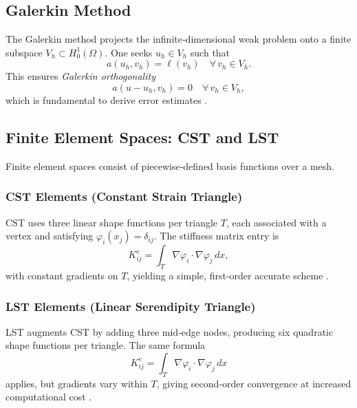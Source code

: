 \subsection{Galerkin Method}

The Galerkin method projects the infinite‐dimensional weak problem onto a finite subspace $V_h\subset H_0^1(\Omega)$.  One seeks $u_h\in V_h$ such that
\begin{equation}
  a(u_h,v_h)=\ell(v_h)
  \quad\forall\,v_h\in V_h.
\end{equation}
This ensures \emph{Galerkin orthogonality}
\begin{equation}
  a(u-u_h,v_h)=0
  \quad\forall\,v_h\in V_h,
\end{equation}
which is fundamental to derive error estimates \cite{Galerkin_method}.

\subsection{Finite Element Spaces: CST and LST}

Finite element spaces consist of piecewise‐defined basis functions over a mesh.

\subsubsection{CST Elements (Constant Strain Triangle)}

CST uses three linear shape functions per triangle $T$, each associated with a vertex and satisfying $\varphi_i(x_j)=\delta_{ij}$.  The stiffness matrix entry is
\begin{equation}
  K^e_{ij}=\int_T\nabla\varphi_i\cdot\nabla\varphi_j\,dx,
\end{equation}
with constant gradients on $T$, yielding a simple, first‐order accurate scheme \cite{finite_element_method}.

\subsubsection{LST Elements (Linear Serendipity Triangle)}

LST augments CST by adding three mid‐edge nodes, producing six quadratic shape functions per triangle.  The same formula
\begin{equation}
  K^e_{ij}=\int_T\nabla\varphi_i\cdot\nabla\varphi_j\,dx
\end{equation}
applies, but gradients vary within $T$, giving second‐order convergence at increased computational cost \cite{finite_element_method}.

